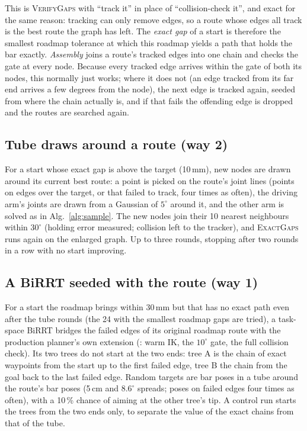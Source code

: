 \documentclass[11pt,a4paper]{article}
\newcommand{\code}[1]{\texttt{\detokenize{#1}}}
\newcommand{\fn}[1]{\textsc{#1}}
\begin{document}
\noindent
This is \fn{VerifyGaps} with ``track it'' in place of ``collision-check it'',
and exact for the same reason: tracking can only remove edges, so a route whose
edges all track is the best route the graph has left. The \emph{exact gap} of a
start is therefore the smallest roadmap tolerance at which this roadmap yields
a path that holds the bar exactly. \emph{Assembly} joins a route's tracked
edges into one chain and checks the gate at every node. Because every tracked
edge arrives within the gate of both its nodes, this normally just works; where
it does not (an edge tracked from its far end arrives a few degrees from the
node), the next edge is tracked again, seeded from where the chain actually
is, and if that fails the offending edge is dropped and the routes are searched
again.

\subsection{Tube draws around a route (way 2)}

For a start whose exact gap is above the target (10\,mm), new nodes are drawn
around its current best route: a point is picked on the route's joint lines
(points on edges over the target, or that failed to track, four times as often),
the driving arm's joints are drawn from a Gaussian of $5^\circ$ around it, and
the other arm is solved as in Alg.~\ref{alg:sample}. The new nodes join their
10 nearest neighbours within $30^\circ$ (holding error measured; collision left
to the tracker), and \fn{ExactGaps} runs again on the enlarged graph. Up to
three rounds, stopping after two rounds in a row with no start improving.

\subsection{A BiRRT seeded with the route (way 1)}

For a start the roadmap brings within 30\,mm but that has no exact path even
after the tube rounds (the 24 with the smallest roadmap gaps are tried), a
task-space BiRRT bridges the failed edges of its original roadmap route
with the production planner's own extension (\code{core.extend_toward}: warm
IK, the $10^\circ$ gate, the full collision check). Its two trees do not start
at the two ends: tree A is the chain of exact waypoints from the start up to
the first failed edge, tree B the chain from the goal back to the last failed
edge. Random targets are bar poses in a tube around the route's bar poses
(5\,cm and $8.6^\circ$ spreads; poses on failed edges four times as often),
with a 10\,\% chance of aiming at the other tree's tip. A control run starts
the trees from the two ends only, to separate the value of the exact chains
from that of the tube.
\end{document}
